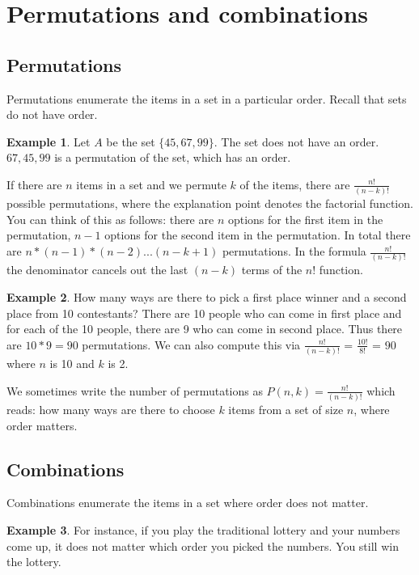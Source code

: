 \documentclass[]{article}
\theoremstyle{definition}
\newtheorem{exmp}{Example}[section]
\begin{document}
\section{Permutations and combinations}

\subsection{Permutations}

Permutations enumerate the items in a set in a particular order. Recall that sets do not have order.

\begin{exmp}
Let $A$ be the set $\{45, 67, 99\}$. The set does not have an order. $67, 45, 99$ is a permutation of the set, which has an order.
\end{exmp} 

If there are $n$ items in a set and we permute $k$ of the items, there are $\frac{n!}{(n-k)!}$ possible permutations, where the explanation point denotes the factorial function. You can think of this as follows: there are $n$ options for the first item in the permutation, $n-1$ options for the second item in the permutation. In total there are $n * (n-1) * (n-2) ... (n - k + 1)$ permutations. In the formula $\frac{n!}{(n-k)!}$ the denominator cancels out the last $(n-k)$ terms of the $n!$ function.

\begin{exmp}
How many ways are there to pick a first place winner and a second place from 10 contestants? There are 10 people who can come in first place and for each of the 10 people, there are 9 who can come in second place. Thus there are $10*9=90$ permutations. We can also compute this via $\frac{n!}{(n-k)!}$ = $\frac{10!}{8!}$ = $90$ where $n$ is 10 and $k$ is 2. 
\end{exmp} 

We sometimes write the number of permutations as $P(n,k) = \frac{n!}{(n-k)!}$ which reads: how many ways are there to choose $k$ items from a set of size $n$, where order matters.

\subsection{Combinations}
Combinations enumerate the items in a set where order does not matter. 

\begin{exmp}
For instance, if you play the traditional lottery and your numbers come up, it does not matter which order you picked the numbers. You still win the lottery. 
\end{exmp} 
\end{document}
